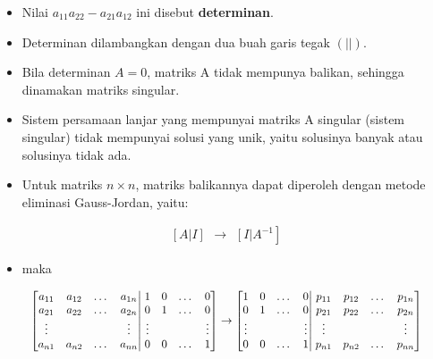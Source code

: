 \documentclass[pdflatex,compress,mathserif]{beamer}
\newcommand*{\Scale}[2][4]{\scalebox{#1}{$#2$}}%
\begin{document}
\begin{frame}
	\begin{itemize}
		\item Nilai $ a_{11} a_{22} - a_{21}a_{12} $ ini disebut \textbf{determinan}.
		\item Determinan dilambangkan dengan dua buah garis tegak $ (| |) $.
		\item Bila determinan $ A = 0 $, matriks A tidak mempunya balikan, sehingga dinamakan matriks singular.
		\item Sistem persamaan lanjar yang mempunyai matriks A singular (sistem singular) tidak mempunyai solusi yang unik, yaitu solusinya banyak atau solusinya tidak ada.
	\end{itemize}
\end{frame}

\begin{frame}
	\begin{itemize}
		\item Untuk matriks $ n \times n $, matriks balikannya dapat diperoleh dengan metode eliminasi Gauss-Jordan, yaitu:
	\end{itemize}
	\[
		\begin{matrix}
			\left[ A \right|
			\left. I \right]
		\end{matrix}
		\rightarrow
		\begin{matrix}
			\left[ I \right|
			\left. A^{-1} \right]
		\end{matrix}
	\]
	\begin{itemize}
		\item[] maka
	\end{itemize}
	\[\Scale[0.9]{
		\left[
			\begin{matrix}
				a_{11} & a_{12} & \dots & a_{1n} \\
				a_{21} & a_{22} & \dots & a_{2n} \\
				\vdots &  &  & \vdots \\
				a_{n1} & a_{n2} & \dots & a_{nn}
			\end{matrix}
		\right|
		\left.
			\begin{matrix}
			1 & 0 & \dots & 0 \\
			0 & 1 & \dots & 0 \\
			\vdots &  &  & \vdots \\
			0 & 0 & \dots & 1
			\end{matrix}
		\right]
		\rightarrow
		\left[
		\begin{matrix}
			1 & 0 & \dots & 0 \\
			0 & 1 & \dots & 0 \\
			\vdots &  &  & \vdots \\
			0 & 0 & \dots & 1
		\end{matrix}
		\right|
		\left.
		\begin{matrix}
			p_{11} & p_{12} & \dots & p_{1n} \\
			p_{21} & p_{22} & \dots & p_{2n} \\
			\vdots &  &  & \vdots \\
			p_{n1} & p_{n2} & \dots & p_{nn}
		\end{matrix}
		\right]
	}\]
\end{frame}
\end{document}

